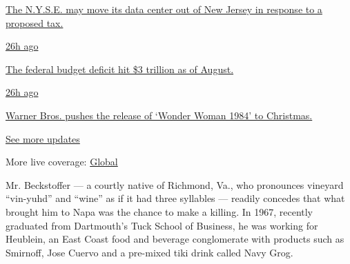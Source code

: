 \href{https://www.nytimes3xbfgragh.onion/live/2020/09/11/business/stock-market-today-coronavirus?action=click\&pgtype=Article\&state=default\&region=MAIN_CONTENT_1\&context=storylines_live_updates\#the-nyse-may-move-its-data-center-out-of-new-jersey-in-response-to-a-proposed-tax}{The
N.Y.S.E. may move its data center out of New Jersey in response to a
proposed tax.}

\href{https://www.nytimes3xbfgragh.onion/live/2020/09/11/business/stock-market-today-coronavirus?action=click\&pgtype=Article\&state=default\&region=MAIN_CONTENT_1\&context=storylines_live_updates\#the-federal-budget-deficit-hit-3-trillion-as-of-august}{26h
ago}

\href{https://www.nytimes3xbfgragh.onion/live/2020/09/11/business/stock-market-today-coronavirus?action=click\&pgtype=Article\&state=default\&region=MAIN_CONTENT_1\&context=storylines_live_updates\#the-federal-budget-deficit-hit-3-trillion-as-of-august}{The
federal budget deficit hit \$3 trillion as of August.}

\href{https://www.nytimes3xbfgragh.onion/live/2020/09/11/business/stock-market-today-coronavirus?action=click\&pgtype=Article\&state=default\&region=MAIN_CONTENT_1\&context=storylines_live_updates\#warner-bros-pushes-the-release-of-wonder-woman-1984-to-christmas}{26h
ago}

\href{https://www.nytimes3xbfgragh.onion/live/2020/09/11/business/stock-market-today-coronavirus?action=click\&pgtype=Article\&state=default\&region=MAIN_CONTENT_1\&context=storylines_live_updates\#warner-bros-pushes-the-release-of-wonder-woman-1984-to-christmas}{Warner
Bros. pushes the release of `Wonder Woman 1984' to Christmas.}

\href{https://www.nytimes3xbfgragh.onion/live/2020/09/11/business/stock-market-today-coronavirus?action=click\&pgtype=Article\&state=default\&region=MAIN_CONTENT_1\&context=storylines_live_updates}{See
more updates}

More live coverage:
\href{https://www.nytimes3xbfgragh.onion/2020/09/11/world/covid-19-coronavirus.html?action=click\&pgtype=Article\&state=default\&region=MAIN_CONTENT_1\&context=storylines_live_updates}{Global}

Mr. Beckstoffer --- a courtly native of Richmond, Va., who pronounces
vineyard ``vin-yuhd'' and ``wine'' as if it had three syllables ---
readily concedes that what brought him to Napa was the chance to make a
killing. In 1967, recently graduated from Dartmouth's Tuck School of
Business, he was working for Heublein, an East Coast food and beverage
conglomerate with products such as Smirnoff, Jose Cuervo and a pre-mixed
tiki drink called Navy Grog.

